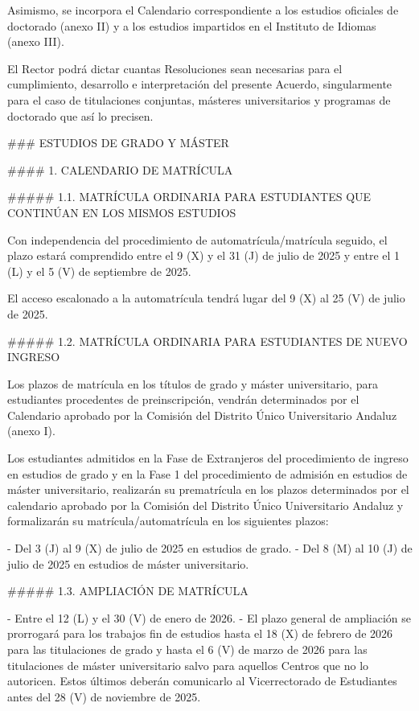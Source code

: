 \documentclass{article}
\begin{document}
\begin{itemize}
\begin{itemize}
\begin{scriptsize}
                  Asimismo, se incorpora el Calendario correspondiente a los estudios oficiales de doctorado (anexo II) y a los estudios impartidos en el Instituto de Idiomas (anexo III).

                  El Rector podrá dictar cuantas Resoluciones sean necesarias para el cumplimiento, desarrollo e interpretación del presente Acuerdo, singularmente para el caso de titulaciones conjuntas, másteres universitarios y programas de doctorado que así lo precisen.

                  \#\#\# ESTUDIOS DE GRADO Y MÁSTER

                  \#\#\#\# 1. CALENDARIO DE MATRÍCULA

                  \#\#\#\#\# 1.1. MATRÍCULA ORDINARIA PARA ESTUDIANTES QUE CONTINÚAN EN LOS MISMOS ESTUDIOS

                  Con independencia del procedimiento de automatrícula/matrícula seguido, el plazo estará comprendido entre el 9 (X) y el 31 (J) de julio de 2025 y entre el 1 (L) y el 5 (V) de septiembre de 2025.

                  El acceso escalonado a la automatrícula tendrá lugar del 9 (X) al 25 (V) de julio de 2025.

                  \#\#\#\#\# 1.2. MATRÍCULA ORDINARIA PARA ESTUDIANTES DE NUEVO INGRESO

                  Los plazos de matrícula en los títulos de grado y máster universitario, para estudiantes procedentes de preinscripción, vendrán determinados por el Calendario aprobado por la Comisión del Distrito Único Universitario Andaluz (anexo I).

                  Los estudiantes admitidos en la Fase de Extranjeros del procedimiento de ingreso en estudios de grado y en la Fase 1 del procedimiento de admisión en estudios de máster universitario, realizarán su prematrícula en los plazos determinados por el calendario aprobado por la Comisión del Distrito Único Universitario Andaluz y formalizarán su matrícula/automatrícula en los siguientes plazos:

                  - Del 3 (J) al 9 (X) de julio de 2025 en estudios de grado.
                  - Del 8 (M) al 10 (J) de julio de 2025 en estudios de máster universitario.

                  \#\#\#\#\# 1.3. AMPLIACIÓN DE MATRÍCULA

                  - Entre el 12 (L) y el 30 (V) de enero de 2026.
                  - El plazo general de ampliación se prorrogará para los trabajos fin de estudios hasta el 18 (X) de febrero de 2026 para las titulaciones de grado y hasta el 6 (V) de marzo de 2026 para las titulaciones de máster universitario salvo para aquellos Centros que no lo autoricen. Estos últimos deberán comunicarlo al Vicerrectorado de Estudiantes antes del 28 (V) de noviembre de 2025.


\end{scriptsize}
\end{itemize}
\end{itemize}
\end{document}
